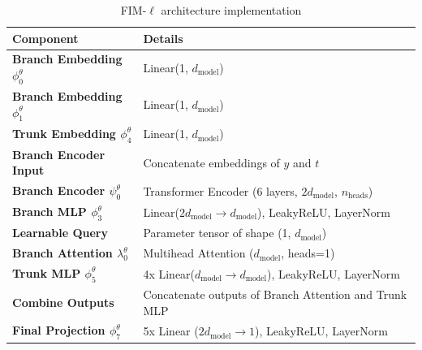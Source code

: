 \documentclass{article}
\theoremstyle{plain}
\theoremstyle{definition}
\theoremstyle{remark}
\begin{document}
\begin{table}[h!]
    \centering
    \label{tab:architecture}
    \renewcommand{\arraystretch}{1.2} %
    \begin{tabular}{p{} p{}}
    \toprule
    \textbf{Component}               & \textbf{Details} \\ \midrule
    \textbf{Branch Embedding $\phi^{\theta}_0$}    & Linear(1, $d_\text{model}$) \\ \midrule
    \textbf{Branch Embedding $\phi^{\theta}_1$}    & Linear(1, $d_\text{model}$) \\ \midrule
    \textbf{Trunk Embedding $\phi^{\theta}_4$}         & Linear(1, $d_\text{model}$) \\ \midrule
    \textbf{Branch Encoder Input}    & Concatenate embeddings of $y$ and $t$ \\ \midrule
    \textbf{Branch Encoder $\psi^{\theta}_0$}          & Transformer Encoder (6 layers, $2d_\text{model}$, $n_\text{heads}$) \\ \midrule
    \textbf{Branch MLP $\phi^{\theta}_3$}              & Linear($2d_\text{model} \to d_\text{model}$), LeakyReLU, LayerNorm \\ \midrule
    \textbf{Learnable Query}         & Parameter tensor of shape (1, $d_\text{model}$) \\ \midrule
    \textbf{Branch Attention $\lambda^{\theta}_0$}        & Multihead Attention ($d_\text{model}$, heads=1) \\ \midrule
    \textbf{Trunk MLP $\phi^{\theta}_5$}               & 4x Linear($d_\text{model} \to d_\text{model}$), LeakyReLU, LayerNorm \\ \midrule
    \textbf{Combine Outputs}         & Concatenate outputs of Branch Attention and Trunk MLP \\ \midrule
    \textbf{Final Projection $\phi^{\theta}_7$}        & 5x Linear ($2d_\text{model} \to 1$), LeakyReLU, LayerNorm \\ 
    \bottomrule
    \end{tabular}
    \caption{FIM-$\ell$ architecture implementation}
    \end{table}
    
\end{document}
